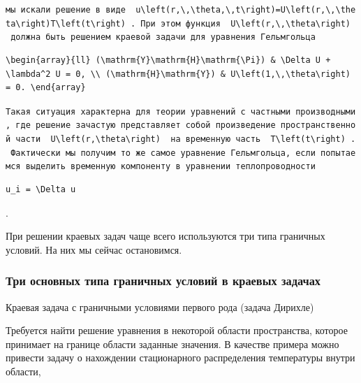\documentclass[
  ukrainian,
]{article}
\begin{document}
\texttt{мы\ искали\ решение\ в\ виде\ \ \textquotesingle{}u\textbackslash{}left(r,\textbackslash{},\textbackslash{}theta,\textbackslash{},t\textbackslash{}right)=U\textbackslash{}left(r,\textbackslash{},\textbackslash{}theta\textbackslash{}right)T\textbackslash{}left(t\textbackslash{}right)\textquotesingle{}\ .\ При\ этом\ функция\ \ \textquotesingle{}U\textbackslash{}left(r,\textbackslash{},\textbackslash{}theta\textbackslash{}right)\textquotesingle{}\ \ должна\ быть\ решением\ краевой\ задачи\ для\ уравнения\ Гельмгольца}

\begin{verbatim}
\begin{array}{ll} (\mathrm{Y}\mathrm{H}\mathrm{\Pi}) & \Delta U + \lambda^2 U = 0, \\ (\mathrm{H}\mathrm{Y}) & U\left(1,\,\theta\right) = 0. \end{array}
\end{verbatim}

\texttt{Такая\ ситуация\ характерна\ для\ теории\ уравнений\ с\ частными\ производными,\ где\ решение\ зачастую\ представляет\ собой\ произведение\ пространственной\ части\ \ \textquotesingle{}U\textbackslash{}left(r,\textbackslash{}theta\textbackslash{}right)\textquotesingle{}\ \ на\ временную\ часть\ \ \textquotesingle{}T\textbackslash{}left(t\textbackslash{}right)\textquotesingle{}\ .\ Фактически\ мы\ получим\ то\ же\ самое\ уравнение\ Гельмгольца,\ если\ попытаемся\ выделить\ временную\ компоненту\ в\ уравнении\ теплопроводности}

\begin{verbatim}
u_i = \Delta u
\end{verbatim}

.

При решении краевых задач чаще всего используются три типа граничных
условий. На них мы сейчас остановимся.

\subsubsection{Три основных типа граничных условий в краевых
задачах}\label{ux442ux440ux438-ux43eux441ux43dux43eux432ux43dux44bux445-ux442ux438ux43fux430-ux433ux440ux430ux43dux438ux447ux43dux44bux445-ux443ux441ux43bux43eux432ux438ux439-ux432-ux43aux440ux430ux435ux432ux44bux445-ux437ux430ux434ux430ux447ux430ux445}

Краевая задача с граничными условиями первого рода (задача Дирихле)

Требуется найти решение уравнения в некоторой области пространства,
которое принимает на границе области заданные значения. В качестве
примера можно привести задачу о нахождении стационарного распределения
температуры внутри области,
\end{document}
